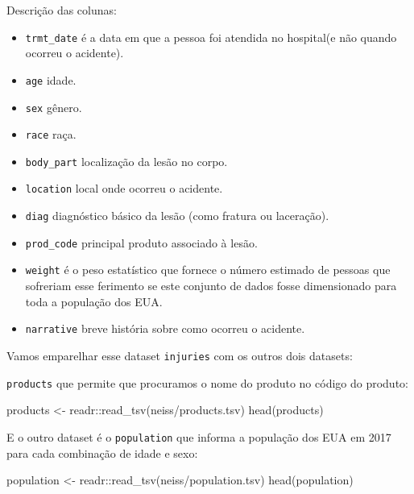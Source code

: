 \documentclass[
]{book}
\newenvironment{Shaded}{\begin{snugshade}}{\end{snugshade}}
\newcommand{\FunctionTok}[1]{\textcolor[rgb]{0.00,0.00,0.00}{#1}}
\newcommand{\NormalTok}[1]{#1}
\newcommand{\OtherTok}[1]{\textcolor[rgb]{0.56,0.35,0.01}{#1}}
\newcommand{\SpecialCharTok}[1]{\textcolor[rgb]{0.00,0.00,0.00}{#1}}
\newcommand{\StringTok}[1]{\textcolor[rgb]{0.31,0.60,0.02}{#1}}
\begin{document}
Descrição das colunas:

\begin{itemize}
\item
  \texttt{trmt\_date} é a data em que a pessoa foi atendida no hospital(e não quando ocorreu o acidente).
\item
  \texttt{age} idade.
\item
  \texttt{sex} gênero.
\item
  \texttt{race} raça.
\item
  \texttt{body\_part} localização da lesão no corpo.
\item
  \texttt{location} local onde ocorreu o acidente.
\item
  \texttt{diag} diagnóstico básico da lesão (como fratura ou laceração).
\item
  \texttt{prod\_code} principal produto associado à lesão.
\item
  \texttt{weight} é o peso estatístico que fornece o número estimado de pessoas que sofreriam esse ferimento se este conjunto de dados fosse dimensionado para toda a população dos EUA.
\item
  \texttt{narrative} breve história sobre como ocorreu o acidente.
\end{itemize}

Vamos emparelhar esse dataset \texttt{injuries} com os outros dois datasets:

\texttt{products} que permite que procuramos o nome do produto no código do produto:

\begin{Shaded}
\begin{Highlighting}[]
\NormalTok{products }\OtherTok{\textless{}{-}}\NormalTok{ readr}\SpecialCharTok{::}\FunctionTok{read\_tsv}\NormalTok{(}\StringTok{\textquotesingle{}neiss/products.tsv\textquotesingle{}}\NormalTok{)}
\FunctionTok{head}\NormalTok{(products)}
\end{Highlighting}
\end{Shaded}

E o outro dataset é o \texttt{population} que informa a população dos EUA em 2017 para cada combinação de idade e sexo:

\begin{Shaded}
\begin{Highlighting}[]
\NormalTok{population }\OtherTok{\textless{}{-}}\NormalTok{ readr}\SpecialCharTok{::}\FunctionTok{read\_tsv}\NormalTok{(}\StringTok{\textquotesingle{}neiss/population.tsv\textquotesingle{}}\NormalTok{)}
\FunctionTok{head}\NormalTok{(population)}
\end{Highlighting}
\end{Shaded}
\end{document}

